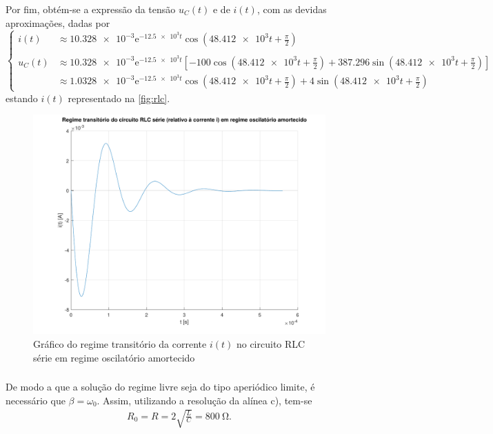 \documentclass[a4paper, titlepage, portuguese]{article}
\newcommand\e{\mathrm{e} }
\begin{document}
		Por fim, obtém-se a expressão da tensão $u_{C}(t)$ e de $i(t)$, com as devidas aproximações, dadas por
		\begin{equation}
   			\begin{cases}
      			i(t) &\approx \num{10.328e-3}\e^{-\num{12.5e3}t} \cos{(\num{48.412e3} t + \frac{\pi}{2})} \\
    			\\u_C(t) &\approx \num{10.328e-3}\e^{-\num{12.5e3} t} \left[ -100 \cos{\left(\num{48.412e3} t + \frac{\pi}{2}\right)}  + \num{387.296}\sin{\left(\num{48.412e3}t + \frac{\pi}{2}\right)} \right] \\
			&\approx \num{1.0328e-3}\e^{-\num{12.5e3} t} \cos{\left(\num{48.412e3} t + \frac{\pi}{2}\right)}  + \num{4}\sin{\left(\num{48.412e3}t + \frac{\pi}{2}\right)}
  			\end{cases}
		\end{equation}
		estando $i(t)$ representado na \autoref{fig:rlc}.
		\begin{figure}[H]
			\centering
			\includegraphics[width=0.7\linewidth]{rlc.pdf}
			\caption{Gráfico do regime transitório da corrente $i(t)$ no circuito RLC série em regime oscilatório amortecido}
			\label{fig:rlc}
		\end{figure}

	\subsubsection{}

		\par
		De modo a que a solução do regime livre seja do tipo aperiódico limite, é necessário que $\beta = \omega_{0}$. Assim, utilizando a resolução da alínea c), tem-se
		\begin{align*}
			 R_0 = R = 2\sqrt{\frac{L}{C}} = \SI{800}{\ohm}.
		\end{align*}
\end{document}
